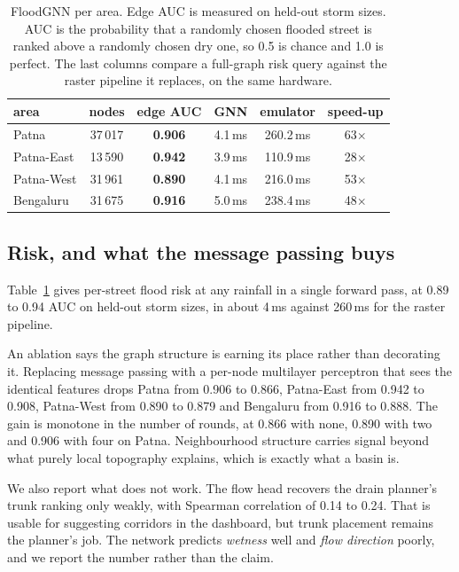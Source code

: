 \begin{table}[!t]
\centering
\caption{FloodGNN per area. Edge AUC is measured on held-out storm sizes. AUC is the probability
that a randomly chosen flooded street is ranked above a randomly chosen dry one, so 0.5 is chance
and 1.0 is perfect. The last columns compare a full-graph risk query against the raster pipeline it
replaces, on the same hardware.}
\label{tab:gnn}
\begin{tabular}{lccccc}
\toprule
area & nodes & edge AUC & GNN & emulator & speed-up \\
\midrule
Patna       & 37\,017 & \textbf{0.906} & 4.1\,ms & 260.2\,ms & 63$\times$ \\
Patna-East  & 13\,590 & \textbf{0.942} & 3.9\,ms & 110.9\,ms & 28$\times$ \\
Patna-West  & 31\,961 & \textbf{0.890} & 4.1\,ms & 216.0\,ms & 53$\times$ \\
Bengaluru   & 31\,675 & \textbf{0.916} & 5.0\,ms & 238.4\,ms & 48$\times$ \\
\bottomrule
\end{tabular}
\end{table}

\subsection{Risk, and what the message passing buys}
Table~\ref{tab:gnn} gives per-street flood risk at any rainfall in a single forward pass, at 0.89
to 0.94 AUC on held-out storm sizes, in about 4\,ms against 260\,ms for the raster pipeline.

An ablation says the graph structure is earning its place rather than decorating it. Replacing
message passing with a per-node multilayer perceptron that sees the identical features drops Patna
from 0.906 to 0.866, Patna-East from 0.942 to 0.908, Patna-West from 0.890 to 0.879 and Bengaluru
from 0.916 to 0.888. The gain is monotone in the number of rounds, at 0.866 with none, 0.890 with
two and 0.906 with four on Patna. Neighbourhood structure carries signal beyond what purely local
topography explains, which is exactly what a basin is.

We also report what does not work. The flow head recovers the drain planner's trunk ranking only
weakly, with Spearman correlation of 0.14 to 0.24. That is usable for suggesting corridors in the
dashboard, but trunk placement remains the planner's job. The network predicts \emph{wetness} well
and \emph{flow direction} poorly, and we report the number rather than the claim.

